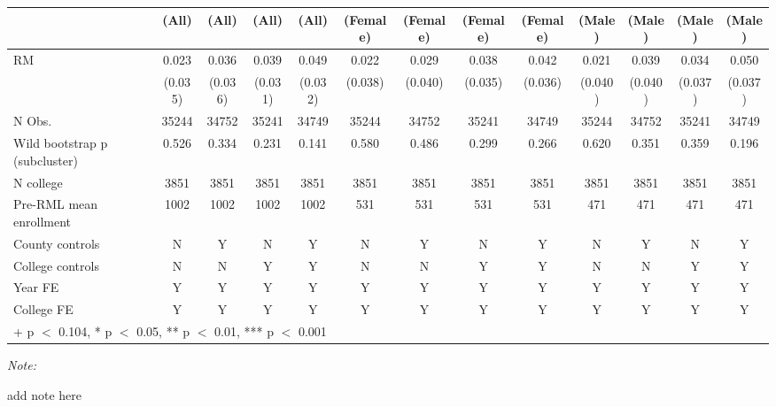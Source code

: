 \begin{table}
\centering
\begin{threeparttable}
\begin{tabular}[t]{lcccccccccccc}
\toprule
  & (All) & (All)  & (All)   & (All)    & (Female) & (Female)  & (Female)   & (Female)    & (Male) & (Male)  & (Male)   & (Male)   \\
\midrule
RM & \num{0.023} & \num{0.036} & \num{0.039} & \num{0.049} & \num{0.022} & \num{0.029} & \num{0.038} & \num{0.042} & \num{0.021} & \num{0.039} & \num{0.034} & \num{0.050}\\
 & (\num{0.035}) & (\num{0.036}) & (\num{0.031}) & (\num{0.032}) & (\num{0.038}) & (\num{0.040}) & (\num{0.035}) & (\num{0.036}) & (\num{0.040}) & (\num{0.040}) & (\num{0.037}) & (\num{0.037})\\
\midrule
N Obs. & \num{35244} & \num{34752} & \num{35241} & \num{34749} & \num{35244} & \num{34752} & \num{35241} & \num{34749} & \num{35244} & \num{34752} & \num{35241} & \num{34749}\\
Wild bootstrap p (subcluster) & 0.526 & 0.334 & 0.231 & 0.141 & 0.580 & 0.486 & 0.299 & 0.266 & 0.620 & 0.351 & 0.359 & 0.196\\
N college & 3851 & 3851 & 3851 & 3851 & 3851 & 3851 & 3851 & 3851 & 3851 & 3851 & 3851 & 3851\\
Pre-RML mean enrollment & 1002 & 1002 & 1002 & 1002 & 531 & 531 & 531 & 531 & 471 & 471 & 471 & 471\\
County controls & N & Y & N & Y & N & Y & N & Y & N & Y & N & Y\\
College controls & N & N & Y & Y & N & N & Y & Y & N & N & Y & Y\\
Year FE & Y & Y & Y & Y & Y & Y & Y & Y & Y & Y & Y & Y\\
College FE & Y & Y & Y & Y & Y & Y & Y & Y & Y & Y & Y & Y\\
\bottomrule
\multicolumn{13}{l}{\rule{0pt}{1em}+ p $<$ 0.104, * p $<$ 0.05, ** p $<$ 0.01, *** p $<$ 0.001}\\
\end{tabular}
\begin{tablenotes}
\item \textit{Note: } 
\item add note here
\end{tablenotes}
\end{threeparttable}
\end{table}
